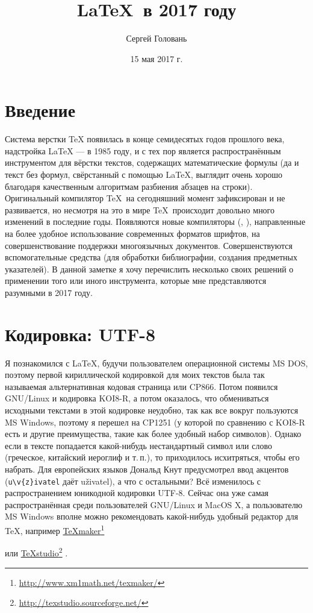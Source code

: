 \documentclass[a4paper,12pt]{article}
\title{\LaTeX\ в 2017 году}
\author{Сергей Головань}
\date{15 мая 2017 г.}
\let\orighref=\href
\renewcommand\href[2]{%
  \orighref{#1}{#2}\footnote{\url{#1}}%
}
\begin{document}
\maketitle
\tableofcontents

\section{Введение}
Система верстки \TeX{} появилась в конце семидесятых годов прошлого века,
надстройка \LaTeX{} --- в 1985 году, и с тех пор является распространённым
инструментом для вёрстки текстов, содержащих математические формулы (да и текст
без формул, свёрстанный с помощью \LaTeX, выглядит очень хорошо благодаря
качественным алгоритмам разбиения абзацев на строки). Оригинальный компилятор
\TeX\ на сегодняшний момент зафиксирован и не развивается, но несмотря на это
в мире \TeX\ происходит довольно много изменений в последние годы. Появляются
новые компиляторы (\XeTeX{}, \LuaTeX{}), направленные
на более удобное использование
современных форматов шрифтов, на совершенствование поддержки многоязычных
документов. Совершенствуются вспомогательные средства (для обработки
библиографии, создания предметных указателей). В данной заметке я хочу
перечислить несколько своих решений о применении того или иного инструмента,
которые мне представляются разумными в 2017 году.

\section{Кодировка: UTF-8}
Я познакомился с \LaTeX, будучи пользователем операционной системы MS DOS,
поэтому первой кириллической кодировкой для моих текстов была так называемая
альтернативная кодовая страница или CP866. Потом появился GNU/Linux и кодировка
KOI8-R, а потом оказалось, что обмениваться исходными текстами в этой кодировке
неудобно, так как все вокруг пользуются MS Windows, поэтому я перешел на
CP1251 (у которой по сравнению с KOI8-R есть и другие преимущества, такие как
более удобный набор символов). Однако если в тексте попадается какой-нибудь
нестандартный символ или слово (греческое, китайский иероглиф и т.\,п.), то
приходилось исхитряться, чтобы его набрать. Для европейских языков Дональд Кнут
предусмотрел ввод акцентов (\verb|u\v{z}ivatel| даёт u\v{z}ivatel), а что с
остальными? Всё изменилось с распространением юникодной кодировки UTF-8. Сейчас
она уже самая распространённая среди пользователей GNU/Linux и MacOS X,
а пользователю MS Windows вполне можно рекомендовать какой-нибудь удобный
редактор для \TeX, например \href{http://www.xm1math.net/texmaker/}{TeXmaker}
или \href{http://texstudio.sourceforge.net/}{TeXstudio}.
\end{document}
